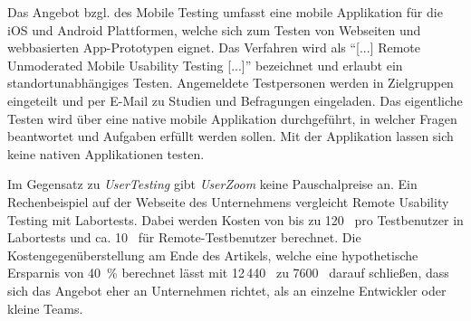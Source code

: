 Das Angebot bzgl. des Mobile Testing umfasst eine mobile Applikation für die iOS und Android Plattformen, welche sich zum Testen von Webseiten und webbasierten App-Prototypen eignet.
Das Verfahren wird als \enquote{[...] Remote Unmoderated Mobile Usability Testing [...]} \cite{UserZoomGmbH.2013c} bezeichnet und erlaubt ein standortunabhängiges Testen.
Angemeldete Testpersonen werden in Zielgruppen eingeteilt und per E-Mail zu Studien und Befragungen eingeladen.
Das eigentliche Testen wird über eine native mobile Applikation durchgeführt, in welcher Fragen beantwortet und Aufgaben erfüllt werden sollen.
Mit der Applikation lassen sich keine nativen Applikationen testen.
\cite[Vgl.][]{UserZoomGmbH.2013c}

Im Gegensatz zu \emph{UserTesting} gibt \emph{UserZoom} keine Pauschalpreise an.
Ein Rechenbeispiel auf der Webseite des Unternehmens vergleicht Remote Usability Testing mit Labortests.
Dabei werden Kosten von bis zu 120~\texteuro\xspace pro Testbenutzer in Labortests und ca. 10~\texteuro\xspace für Remote-Testbenutzer berechnet.
Die Kostengegenüberstellung am Ende des Artikels, welche eine hypothetische Ersparnis von 40~\% berechnet lässt mit 12\,440~\texteuro\xspace zu 7600~\texteuro\xspace darauf schließen, dass sich das Angebot eher an Unternehmen richtet, als an einzelne Entwickler oder kleine Teams.
\cite[Vgl.][]{UserZoomGmbH.2013d}